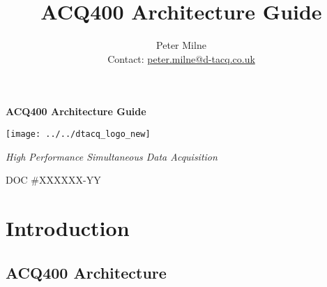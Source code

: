 \documentclass[]{article}
\newcommand{\mytitle}{ACQ400 Architecture Guide}
\begin{document}
\title{ACQ400 Architecture Guide}
\author{Peter Milne \\ Contact: \href{mailto:peter.milne@d-tacq.co.uk}{peter.milne@d-tacq.co.uk} }

\thispagestyle{empty} %
\begin{center}\huge{\textbf{\mytitle}}\end{center}
\vspace{2.5cm}
\begin{center}
	\texttt{[image: ../../dtacq\_logo\_new]}
\end{center}
\begin{center}\textcolor{dtacqblue}{\large{\textit{High Performance Simultaneous Data Acquisition}}}\end{center}
\vspace{5cm}
\begin{center}\large{DOC \#XXXXXX-YY}\end{center}


\begin{versionhistory}
\end{versionhistory}
\setcounter{table}{0} %

\pagebreak

\tableofcontents


\section{Introduction}

\subsection{ACQ400 Architecture}
\end{document}
